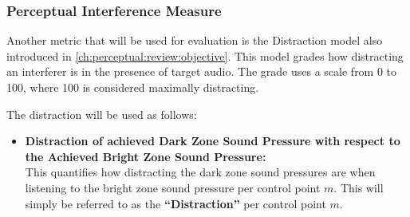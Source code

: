 \subsubsection{Perceptual Interference Measure}
Another metric that will be used for evaluation is the Distraction model also introduced in \autoref{ch:perceptual:review:objective}.
This model grades how distracting an interferer is in the presence of target audio.
The grade uses a scale from 0 to 100, where 100 is considered maximally distracting.

The distraction will be used as follows:
\begin{itemize}
    \item \textbf{Distraction of achieved Dark Zone Sound Pressure with respect to the Achieved Bright 
        Zone Sound Pressure:}\\
        This quantifies how distracting the dark zone sound pressures are when listening to the bright zone 
        sound pressure per control point $m$. 
        This will simply be referred to as the \textbf{``Distraction''} per control point $m$.
\end{itemize}

